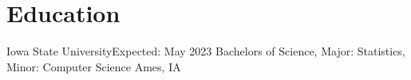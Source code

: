 \section{Education}
  \resumeSubHeadingListStart
    \resumeSubheading
      {Iowa State University}{Expected: May 2023}
      {Bachelors of Science, Major: Statistics, Minor: Computer Science }{Ames, IA}
        \resumeItemListStart
        \resumeItemListEnd
  \resumeSubHeadingListEnd
